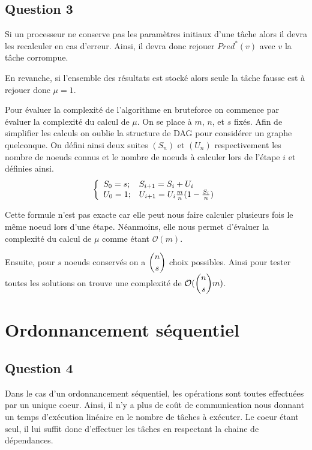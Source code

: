 \documentclass[11pt]{article}
\newenvironment{system}[1]
  {\left\{\begin{array}{#1}}
  {\end{array}\right.}
\begin{document}

  \subsection{Question 3}
    Si un processeur ne conserve pas les paramètres initiaux d'une tâche alors
    il devra les recalculer en cas d'erreur. Ainsi, il devra donc rejouer
    $Pred^*(v)$ avec $v$ la tâche corrompue.

    En revanche, si l'ensemble des résultats est stocké alors seule la tâche
    fausse est à rejouer donc $\mu = 1$.

    Pour évaluer la complexité de l'algorithme en bruteforce on commence par
    évaluer la complexité du calcul de $\mu$. On se place à $m$, $n$, et $s$
    fixés. Afin de simplifier les calculs on oublie la structure de DAG pour
    considérer un graphe quelconque. On défini ainsi deux suites $(S_n)$ et
    $(U_n)$ respectivement les nombre de noeuds connus et le nombre de noeuds
    à calculer lors de l'étape $i$ et définies ainsi.
    \[ \begin{system}{ll}
      S_0 = s ; & S_{i+1} = S_i + U_i \\
      U_0 = 1 ; & U_{i+1} = U_i \frac{m}{n} (1 - \frac{S_i}{n})
    \end{system} \]

    Cette formule n'est pas exacte car elle peut nous faire calculer plusieurs
    fois le même noeud lors d'une étape. Néanmoins, elle nous permet d'évaluer
    la complexité du calcul de $\mu$ comme étant $\mathcal{O}(m)$.

    Ensuite, pour $s$ noeuds conservés on a $\dbinom{n}{s}$ choix possibles.
    Ainsi pour tester toutes les solutions on trouve une complexité de
    $\mathcal{O}(\dbinom{n}{s}m)$.

\section{Ordonnancement séquentiel}
  \subsection{Question 4}
    Dans le cas d'un ordonnancement séquentiel, les opérations sont toutes
    effectuées par un unique coeur. Ainsi, il n'y a plus de coût de
    communication nous donnant un temps d'exécution linéaire en le nombre de
    tâches à exécuter. Le coeur étant seul, il lui suffit donc d'effectuer les
    tâches en respectant la chaine de dépendances.
\end{document}
